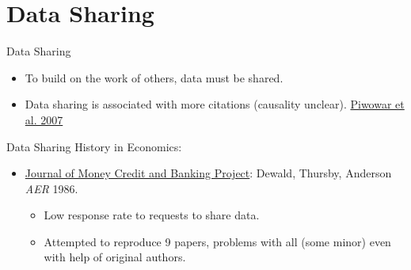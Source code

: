 \documentclass{beamer}
\begin{document}
\section{Data Sharing}
\begin{frame}{Data Sharing}
\begin{itemize}
\item
To build on the work of others, data must be shared.
\item
Data sharing is associated with more citations (causality unclear). \href{http://journals.plos.org/plosone/article?id=10.1371/journal.pone.0000308}{Piwowar et al. 2007} 
\end{itemize}
\end{frame}

\begin{frame}{Data Sharing}
History in Economics:
\begin{itemize}
\item  \href{http://www.jstor.org/stable/1806061}{Journal of Money Credit and Banking Project}: Dewald, Thursby, Anderson \textit{AER} 1986. 
\begin{itemize}
\item Low response rate to requests to share data.
\item Attempted to reproduce 9 papers, problems with all (some minor) even with help of original authors.
\end{itemize}
\end{itemize}
\end{frame}


{ %
    \begin{frame}[plain]
     \end{frame}
}
\end{document}
